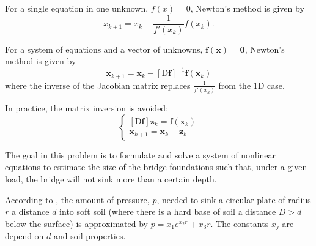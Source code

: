 \documentclass[12pt,letterpaper,noanswers]{exam}
\newcommand{\vc}[1]{\boldsymbol{#1}}
\begin{document}
\begin{questions}
For a single equation in one unknown, $f(x) = 0$, Newton's method is given by \[x_{k+1} = x_k - \frac{1}{f'(x_k)}f(x_k).\]

For a system of equations and a vector of unknowns, $\vc{f}(\vc{x})= \vc{0}$, Newton's method is given by
\[\vc{x}_{k+1} = \vc{x}_k - \left[\text{D}\vc{f}\right]^{-1}\vc{f}(\vc{x}_k)\] where the inverse of the Jacobian matrix replaces $\frac{1}{f'(x_k)}$ from the 1D case.

In practice, the matrix inversion is avoided:
\[\left\{\begin{array}{c}
\left[\text{D}\vc{f}\right]\vc{z}_k = \vc{f}(\vc{x}_k) \\
\vc{x}_{k+1} = \vc{x}_k - \vc{z}_k
\end{array}\right.\]

The goal in this problem is to formulate and solve a system of nonlinear equations to estimate the size of the bridge-foundations such that, under a given load, the bridge will not sink more than a certain depth.

According to \cite{burden2010numerical}, the amount of pressure, $p$, needed to sink a circular plate of radius $r$ a distance $d$ into soft soil (where there is a hard base of soil a distance $D>d$ below the surface) is approximated by $p = x_1 e^{x_2 r} + x_3 r$.  The constants $x_j$ are depend on $d$ and soil properties.

\end{questions}
\end{document}

